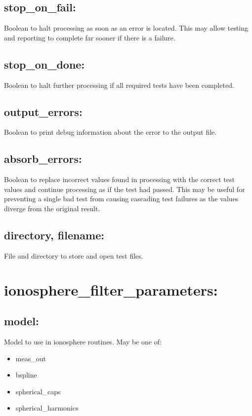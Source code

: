 \subsection*{stop\_on\_fail:}

Boolean to halt processing as soon as an error is located. This may allow testing and reporting to complete far sooner if there is a failure.

\subsection*{stop\_on\_done:}

Boolean to halt further processing if all required tests have been completed.

\subsection*{output\_errors:}

Boolean to print debug information about the error to the output file.

\subsection*{absorb\_errors:}

Boolean to replace incorrect values found in processing with the correct test values and continue processing as if the test had passed.
This may be useful for preventing a single bad test from causing cascading test failures as the values diverge from the original result.

\subsection*{directory, filename:}

File and directory to store and open test files.





\section{ionosphere\_filter\_parameters:}

\subsection*{model:}

Model to use in ionosphere routines. May be one of:
\begin{itemize}
\item meas\_out
\item bspline
\item spherical\_caps
\item spherical\_harmonics
\end{itemize}

